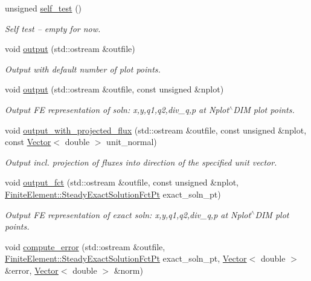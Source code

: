 \begin{DoxyCompactItemize}
unsigned \hyperlink{classoomph_1_1DarcyEquations_adee6b430a8f62190a5cad003c195f52e}{self\+\_\+test} ()
\begin{DoxyCompactList}\small\item\em Self test -- empty for now. \end{DoxyCompactList}\item 
void \hyperlink{classoomph_1_1DarcyEquations_ac523da40b92a26e3d32c1a5e985e0d40}{output} (std\+::ostream \&outfile)
\begin{DoxyCompactList}\small\item\em Output with default number of plot points. \end{DoxyCompactList}\item 
void \hyperlink{classoomph_1_1DarcyEquations_afa8de4033583509bffda8b0b8b34d6de}{output} (std\+::ostream \&outfile, const unsigned \&nplot)
\begin{DoxyCompactList}\small\item\em Output FE representation of soln\+: x,y,q1,q2,div\+\_\+q,p at Nplot$^\wedge$\+D\+IM plot points. \end{DoxyCompactList}\item 
void \hyperlink{classoomph_1_1DarcyEquations_a386bf5d62e4ad7dc8df9e0a55bc9d158}{output\+\_\+with\+\_\+projected\+\_\+flux} (std\+::ostream \&outfile, const unsigned \&nplot, const \hyperlink{classoomph_1_1Vector}{Vector}$<$ double $>$ unit\+\_\+normal)
\begin{DoxyCompactList}\small\item\em Output incl. projection of fluxes into direction of the specified unit vector. \end{DoxyCompactList}\item 
void \hyperlink{classoomph_1_1DarcyEquations_a2b072036a9fba0dfcf682f9a5d2fa2b6}{output\+\_\+fct} (std\+::ostream \&outfile, const unsigned \&nplot, \hyperlink{classoomph_1_1FiniteElement_a690fd33af26cc3e84f39bba6d5a85202}{Finite\+Element\+::\+Steady\+Exact\+Solution\+Fct\+Pt} exact\+\_\+soln\+\_\+pt)
\begin{DoxyCompactList}\small\item\em Output FE representation of exact soln\+: x,y,q1,q2,div\+\_\+q,p at Nplot$^\wedge$\+D\+IM plot points. \end{DoxyCompactList}\item 
void \hyperlink{classoomph_1_1DarcyEquations_aafb8f62e6b3f584d28d7547e8d01b6d4}{compute\+\_\+error} (std\+::ostream \&outfile, \hyperlink{classoomph_1_1FiniteElement_a690fd33af26cc3e84f39bba6d5a85202}{Finite\+Element\+::\+Steady\+Exact\+Solution\+Fct\+Pt} exact\+\_\+soln\+\_\+pt, \hyperlink{classoomph_1_1Vector}{Vector}$<$ double $>$ \&error, \hyperlink{classoomph_1_1Vector}{Vector}$<$ double $>$ \&norm)

\end{DoxyCompactItemize}
